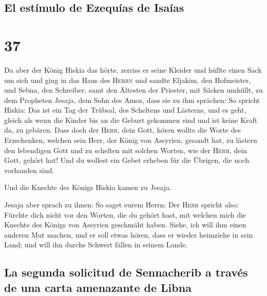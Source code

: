 \hypertarget{el-estuxedmulo-de-ezequuxedas-de-isauxedas}{%
\subsection{El estímulo de Ezequías de
Isaías}\label{el-estuxedmulo-de-ezequuxedas-de-isauxedas}}

\hypertarget{section-36}{%
\section{37}\label{section-36}}

 Da aber der König Hiskia das hörte, zerriss er seine
Kleider und hüllte einen Sack um sich und ging in das Haus des
\textsc{Herrn}  und sandte Eljakim, den Hofmeister, und
Sebna, den Schreiber, samt den Ältesten der Priester, mit Säcken
umhüllt, zu dem Propheten Jesaja, dem Sohn des Amoz,  dass
sie zu ihm sprächen: So spricht Hiskia: Das ist ein Tag der Trübsal, des
Scheltens und Lästerns, und es geht, gleich als wenn die Kinder bis an
die Geburt gekommen sind und ist keine Kraft da, zu gebären.
 Dass doch der \textsc{Herr}, dein Gott, hören wollte die
Worte des Erzschenken, welchen sein Herr, der König von Assyrien,
gesandt hat, zu lästern den lebendigen Gott und zu schelten mit solchen
Worten, wie der \textsc{Herr}, dein Gott, gehört hat! Und du wollest ein
Gebet erheben für die Übrigen, die noch vorhanden sind.

 Und die Knechte des Königs Hiskia kamen zu Jesaja.

 Jesaja aber sprach zu ihnen: So saget eurem Herrn: Der
\textsc{Herr} spricht also: Fürchte dich nicht vor den Worten, die du
gehört hast, mit welchen mich die Knechte des Königs von Assyrien
geschmäht haben.  Siehe, ich will ihm einen anderen Mut
machen, und er soll etwas hören, dass er wieder heimziehe in sein Land;
und will ihn durchs Schwert fällen in seinem Lande.

\hypertarget{la-segunda-solicitud-de-sennacherib-a-travuxe9s-de-una-carta-amenazante-de-libna}{%
\subsection{La segunda solicitud de Sennacherib a través de una carta
amenazante de
Libna}\label{la-segunda-solicitud-de-sennacherib-a-travuxe9s-de-una-carta-amenazante-de-libna}}

